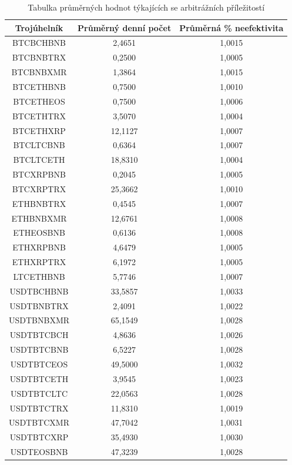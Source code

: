 \documentclass[thesis=B,czech]{FITthesis}[2019/03/21]
\begin{document}
\begin{table}\centering
\caption{Tabulka průměrných hodnot týkajících se arbitrážních příležitostí}
\label{table_averages}
\begin{tabular}{|| c | c | c ||}\hline Trojúhelník & Průměrný denní počet & Průměrná \% neefektivita\\ [0.5ex]
 \hline\hline BTCBCHBNB & 2,4651 & 1,0015\\ 
 \hline BTCBNBTRX & 0,2500 & 1,0005\\ 
 \hline BTCBNBXMR & 1,3864 & 1,0015\\ 
 \hline BTCETHBNB & 0,7500 & 1,0010\\ 
 \hline BTCETHEOS & 0,7500 & 1,0006\\ 
 \hline BTCETHTRX & 3,5070 & 1,0004\\ 
 \hline BTCETHXRP & 12,1127 & 1,0007\\ 
 \hline BTCLTCBNB & 0,6364 & 1,0007\\ 
 \hline BTCLTCETH & 18,8310 & 1,0004\\ 
 \hline BTCXRPBNB & 0,2045 & 1,0005\\ 
 \hline BTCXRPTRX & 25,3662 & 1,0010\\ 
 \hline ETHBNBTRX & 0,4545 & 1,0007\\ 
 \hline ETHBNBXMR & 12,6761 & 1,0008\\ 
 \hline ETHEOSBNB & 0,6136 & 1,0008\\ 
 \hline ETHXRPBNB & 4,6479 & 1,0005\\ 
 \hline ETHXRPTRX & 6,1972 & 1,0005\\ 
 \hline LTCETHBNB & 5,7746 & 1,0007\\ 
 \hline USDTBCHBNB & 33,5857 & 1,0033\\ 
 \hline USDTBNBTRX & 2,4091 & 1,0022\\ 
 \hline USDTBNBXMR & 65,1549 & 1,0028\\ 
 \hline USDTBTCBCH & 4,8636 & 1,0026\\ 
 \hline USDTBTCBNB & 6,5227 & 1,0028\\ 
 \hline USDTBTCEOS & 49,5000 & 1,0032\\ 
 \hline USDTBTCETH & 3,9545 & 1,0023\\ 
 \hline USDTBTCLTC & 22,0563 & 1,0028\\ 
 \hline USDTBTCTRX & 11,8310 & 1,0019\\ 
 \hline USDTBTCXMR & 47,7042 & 1,0031\\ 
 \hline USDTBTCXRP & 35,4930 & 1,0030\\ 
 \hline USDTEOSBNB & 47,3239 & 1,0028\\ 

\end{tabular}
\end{table}
\end{document}
